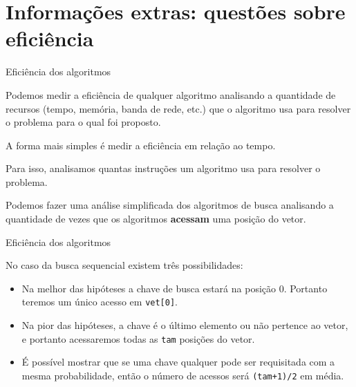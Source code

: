 \documentclass[handout]{beamer}
\newcommand{\cod}[1]{\texttt{#1}}
\begin{document}
\section{Informações extras: questões sobre eficiência}

\begin{frame}[fragile]{Eficiência dos algoritmos}

    \begin{block}{}
        Podemos medir a eficiência de qualquer algoritmo analisando a quantidade de recursos (tempo, memória, banda de rede, etc.) que o algoritmo usa para resolver o problema para o qual foi proposto.
    \end{block}

    A forma mais simples é medir a eficiência em relação ao tempo.
    
    Para isso, analisamos quantas instruções um algoritmo usa para resolver o problema.

    Podemos fazer uma análise simplificada dos algoritmos de busca analisando a quantidade de vezes que os algoritmos {\bf acessam} uma posição do vetor.

\end{frame}

\begin{frame}[fragile]{Eficiência dos algoritmos}

    No caso da busca sequencial existem três possibilidades:

    \begin{itemize}
        \item Na melhor das hipóteses a chave de busca estará na posição 0. Portanto teremos um único acesso em \cod{vet[0]}.
        \item Na pior das hipóteses, a chave é o último elemento ou não pertence ao vetor, e portanto acessaremos todas as \cod{tam} posições do vetor.
        \item É possível mostrar que se uma chave qualquer pode ser requisitada com a mesma probabilidade, então o número de acessos será \cod{(tam+1)/2} em média.
    \end{itemize}

\end{frame}
\end{document}
